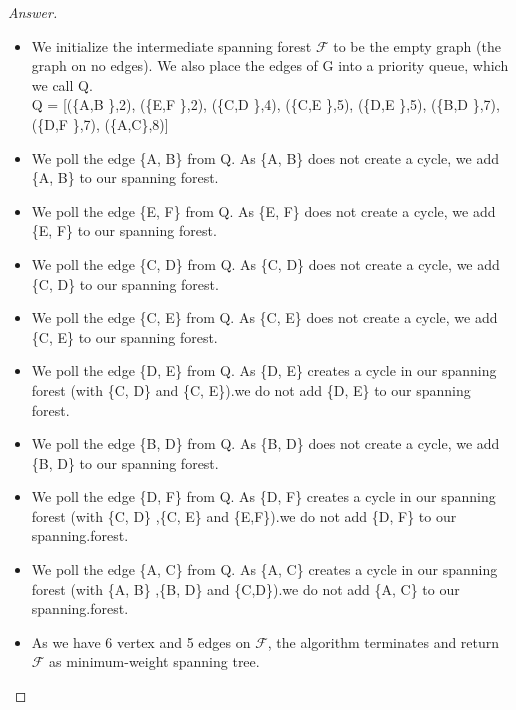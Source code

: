 \documentclass[11pt]{article}
\theoremstyle{definition}
\theoremstyle{definition}
\theoremstyle{definition}
\begin{document}
\begin{proof}[Answer]
\begin{itemize}
\item We initialize the intermediate spanning forest $\mathcal{F}$ to be the empty graph (the graph on no edges). We also
place the edges of G into a priority queue, which we call Q.\\ 
 Q = [(\{A,B \},2), (\{E,F \},2), (\{C,D \},4), (\{C,E \},5), (\{D,E \},5), (\{B,D \},7), (\{D,F \},7), (\{A,C\},8)]
\item We poll the edge \{A, B\} from Q. As \{A, B\} does not create a cycle, we add \{A, B\} to our spanning forest.
\item We poll the edge \{E, F\} from Q. As \{E, F\} does not create a cycle, we add \{E, F\} to our spanning forest.
\item We poll the edge \{C, D\} from Q. As \{C, D\} does not create a cycle, we add \{C, D\} to our spanning forest.
\item We poll the edge \{C, E\} from Q. As \{C, E\} does not create a cycle, we add \{C, E\} to our spanning forest.
\item We poll the edge \{D, E\} from Q. As \{D, E\} creates a cycle in our spanning forest (with \{C, D\} and \{C, E\}).we do not add \{D, E\} to our spanning forest.
\item We poll the edge \{B, D\} from Q. As \{B, D\} does not create a cycle, we add \{B, D\} to our spanning forest.
\item We poll the edge \{D, F\} from Q. As \{D, F\} creates a cycle in our spanning forest (with \{C, D\} ,\{C, E\} and \{E,F\}).we do not add \{D, F\} to our spanning.forest.
\item We poll the edge \{A, C\} from Q. As \{A, C\} creates a cycle in our spanning forest (with \{A, B\} ,\{B, D\} and \{C,D\}).we do not add \{A, C\} to our spanning.forest.
\item As we have 6 vertex and 5 edges on $\mathcal{F}$, the algorithm terminates and return $\mathcal{F}$ as minimum-weight spanning tree. 
\end{itemize}
\end{proof}




\end{document}
